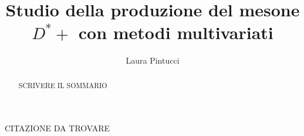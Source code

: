 \documentclass[a4paper, twoside]{report}
\title{Studio della produzione del mesone $D^*+$ con metodi multivariati}
\author{Laura Pintucci}
\begin{document}

\thispagestyle{empty} 

\cleardoublepage



\thispagestyle{empty} 
\begin{flushright}%
\null {}

CITAZIONE DA TROVARE

\null
\end{flushright}





\begin{abstract}
SCRIVERE IL SOMMARIO
\end{abstract}


\tableofcontents
\listoffigures
\listoftables













\end{document}
